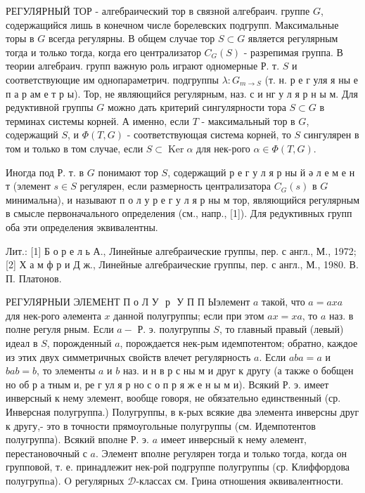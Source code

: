 \documentclass[10pt]{article}
\begin{document}
РЕГУЛЯРНЫЙ ТОР - алгебраический тор в связной алгебраич. группе $G$, содержащийся лишь в конечном числе борелевских подгрупп. Максимальные торы в $G$ всегда регулярны. В общем случае тор $S \subset G$ является регулярным тогда и только тогда, когда его централизатор $C_{G}(S)$ - разрепимая группа. В теории алгебраич. групп важную роль играют одномерные Р. т. $S$ и соответствующие им однопараметрич. подгруппы $\lambda: G_{m \rightarrow S}$ (т. н. р е г уля я ны е п а р ам е т р ы). Тор, не являющийся регулярным, наз. с и нг у л я р н ы м. Для редуктивной группы $G$ можно дать критерий сингулярности тора $S \subset G$ в терминах системы корней. А именно, если $T$ - максимальный тор в $G$, содержащий $S$, и $\Phi(T, G)$ - соответствующая система корней, то $S$ сингулярен в том и только в том случае, если $S \subset \operatorname{Ker} \alpha$ для нек-рого $\alpha \in \Phi(T, G)$.



Иногда под Р. т. в $G$ понимают тор $S$, содержащий р е г у л я р ны й ә л е м е н т (элемент $s \in S$ регулярен, если размерность централизатора $C_{G}(s)$ в $G$ минимальна), и называют п о л у р е г у л я р ны м тор, являющийся регулярным в смысле первоначального определения (см., напр., [1]). Для редуктивных групп оба эти определения эквивалентны.



Лит.: [1] Б о р е л ь А., Линейные алгебраические группы, пер. с англ., М., 1972; [2] Х а м ф р и Д ж., Линейные алгебраические группы, пер. с англ., М., 1980. В. П. Платонов.



РЕГУЛЯРНЫИ ЭЛЕМЕНТ П о Л У $\mathbf{\text { р }}$ У П П Ыэлемент $a$ такой, что $a=a x a$ для нек-рого әлемента $x$ данной полугруппы; если при этом $a x=x a$, то $a$ наз. в полне регуля рным. Если $a-$ Р. э. полугруппы $S$, то главный правый (левый) идеал в $S$, порожденный $a$, порождается нек-рым идемпотентом; обратно, каждое из этих двух симметричных свойств влечет регулярность $a$. Если $a b a=a$ и $b a b=b$, то элементы $a$ и $b$ наз. и н в р с ны м и друг к другу (а также о бобщен но об р а тным и, ре г ул я р но с о п р я ж е н ы м и). Всякий Р. э. имеет инверсный к нему элемент, вообще говоря, не обязательно единственный (ср. Инверсная полугруппа.) Полугруппы, в к-рых всякие два элемента инверсны друг к другу,- это в точности прямоугольные полугруппы (см. Идемпотентов полугруппа). Всякий вполне Р. э. $a$ имеет инверсный к нему әлемент, перестановочный с $a$. Элемент вполне регулярен тогда и только тогда, когда он групповой, т. е. принадлежит нек-рой подгруппе полугруппы (ср. Клиффордова полугрупnа). $\mathrm{O}$ регулярных $\mathscr{D}$-классах см. Грина отношения әквивалентности.
\end{document}
